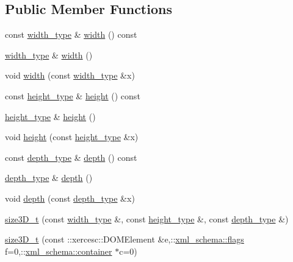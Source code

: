 \subsection*{Public Member Functions}
\begin{DoxyCompactItemize}
\item 
const \hyperlink{classsize3D__t_a7d35a723ccd7d990ae9b91f8d8856a69}{width\-\_\-type} \& \hyperlink{classsize3D__t_a6e1d6d6dd0e972c464485d79ac561a25}{width} () const 
\item 
\hyperlink{classsize3D__t_a7d35a723ccd7d990ae9b91f8d8856a69}{width\-\_\-type} \& \hyperlink{classsize3D__t_a858b060e5e4a413554a275ba99ed5721}{width} ()
\item 
void \hyperlink{classsize3D__t_a5af433452dea754f77aa6198cc341d1f}{width} (const \hyperlink{classsize3D__t_a7d35a723ccd7d990ae9b91f8d8856a69}{width\-\_\-type} \&x)
\item 
const \hyperlink{classsize3D__t_adc8341bc222084318ef434ea22833f69}{height\-\_\-type} \& \hyperlink{classsize3D__t_a1c8f9f2245b9aa0398a98c01b7ad4ae3}{height} () const 
\item 
\hyperlink{classsize3D__t_adc8341bc222084318ef434ea22833f69}{height\-\_\-type} \& \hyperlink{classsize3D__t_a78accf4a2dc58f58d7302596b7536857}{height} ()
\item 
void \hyperlink{classsize3D__t_ab324cb8b665c55f78c34f071df3a652c}{height} (const \hyperlink{classsize3D__t_adc8341bc222084318ef434ea22833f69}{height\-\_\-type} \&x)
\item 
const \hyperlink{classsize3D__t_acc72088c95989e8ecee3fef8118cb91e}{depth\-\_\-type} \& \hyperlink{classsize3D__t_a4c20956b2af7b52a01eb34e0c5e6d5ea}{depth} () const 
\item 
\hyperlink{classsize3D__t_acc72088c95989e8ecee3fef8118cb91e}{depth\-\_\-type} \& \hyperlink{classsize3D__t_a32b25671a5c39e9c56a2451063f00b38}{depth} ()
\item 
void \hyperlink{classsize3D__t_afe67f4b26f8c7240b6f0829ad1c90bea}{depth} (const \hyperlink{classsize3D__t_acc72088c95989e8ecee3fef8118cb91e}{depth\-\_\-type} \&x)
\item 
\hyperlink{classsize3D__t_a534bb01312bde80cc754c21b89dcba13}{size3\-D\-\_\-t} (const \hyperlink{classsize3D__t_a7d35a723ccd7d990ae9b91f8d8856a69}{width\-\_\-type} \&, const \hyperlink{classsize3D__t_adc8341bc222084318ef434ea22833f69}{height\-\_\-type} \&, const \hyperlink{classsize3D__t_acc72088c95989e8ecee3fef8118cb91e}{depth\-\_\-type} \&)
\item 
\hyperlink{classsize3D__t_a364f8c8f2f0521af3a5667e65932930d}{size3\-D\-\_\-t} (const \-::xercesc\-::\-D\-O\-M\-Element \&e,\-::\hyperlink{namespacexml__schema_a0612287d030cb2732d31a45b258fdc87}{xml\-\_\-schema\-::flags} f=0,\-::\hyperlink{namespacexml__schema_ada9aa30dc722e93ee2ed7243085402a5}{xml\-\_\-schema\-::container} $\ast$c=0)

\end{DoxyCompactItemize}
